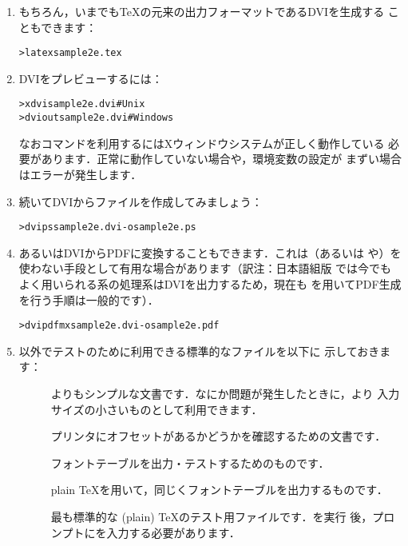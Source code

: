 \documentclass[uplatex,dvipdfmx,tombow]{jsarticle}
\begin{document}
\begin{enumerate}
\item もちろん，いまでも\TeX の元来の出力フォーマットであるDVIを生成する
こともできます：
%
\begin{alltt}
> latex sample2e.tex
\end{alltt}

\item DVIをプレビューするには：
%
\begin{alltt}
> xdvi sample2e.dvi    # Unix
> dviout sample2e.dvi  # Windows
\end{alltt}
%
なおコマンドを利用するにはXウィンドウシステムが正しく動作している
必要があります．正常に動作していない場合や，環境変数の設定が
まずい場合はエラーが発生します．

\item 続いてDVIから\PS ファイルを作成してみましょう：
%
\begin{alltt}
> dvips sample2e.dvi -o sample2e.ps
\end{alltt}

\item あるいはDVIからPDFに変換することもできます．これは\pdfTeX （あるいは
\XeTeX や\LuaTeX）を使わない手段として有用な場合があります（訳注：日本語組版
では今でもよく用いられる\pTeX 系の処理系はDVIを出力するため，現在も
を用いてPDF生成を行う手順は一般的です）．
%
\begin{alltt}
> dvipdfmx sample2e.dvi -o sample2e.pdf
\end{alltt}

\item {}以外でテストのために利用できる標準的なファイルを以下に
示しておきます：
%
\begin{description}
\item []
よりもシンプルな文書です．なにか問題が発生したときに，より
入力サイズの小さいものとして利用できます．

\item []
プリンタにオフセットがあるかどうかを確認するための文書です．

\item []
フォントテーブルを出力・テストするためのものです．

\item []
plain \TeX を用いて，同じくフォントテーブルを出力するものです．

\item []
最も標準的な (plain) \TeX のテスト用ファイルです．を実行
後，\code{*}プロンプトにを入力する必要があります．
\end{description}


\end{enumerate}
\end{document}
